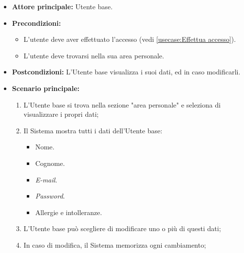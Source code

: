 \label{usecase:Visualizza e modifica dati utente}
\begin{itemize}
	\item \textbf{Attore principale:} Utente base.

	\item \textbf{Precondizioni:}
	\begin{itemize}
        \item L'utente deve aver effettuato l'accesso (vedi \autoref{usecase:Effettua accesso}).
        \item L'utente deve trovarsi nella sua area personale.
    \end{itemize}

	\item \textbf{Postcondizioni:} L'Utente base visualizza i suoi dati, ed in caso modificarli.

	\item \textbf{Scenario principale:}
	      \begin{enumerate}
		      \item L'Utente base si trova nella sezione "area personale" e seleziona di visualizzare i propri dati;
		      \item Il Sistema mostra tutti i dati dell'Utente base:
              \begin{itemize}
                \item Nome.
                \item Cognome.
                \item \textit{E-mail}.
                \item \textit{Password}.
                \item Allergie e intolleranze.
              \end{itemize}
              \item L'Utente base può scegliere di modificare uno o più di questi dati;
              \item In caso di modifica, il Sistema memorizza ogni cambiamento;
	      \end{enumerate}
\end{itemize}
